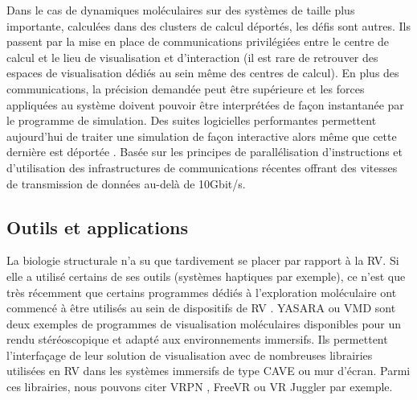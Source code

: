 Dans le cas de dynamiques moléculaires sur des systèmes de taille plus importante, calculées dans des clusters de calcul déportés, les défis sont autres. Ils passent par la mise en place de communications privilégiées entre le centre de calcul et le lieu de visualisation et d'interaction (il est rare de retrouver des espaces de visualisation dédiés au sein même des centres de calcul). En plus des communications, la précision demandée peut être supérieure et les forces appliquées au système doivent pouvoir être interprétées de façon instantanée par le programme de simulation. Des suites logicielles performantes permettent aujourd'hui de traiter une simulation de façon interactive alors même que cette dernière est déportée \cite{dreher2014exaviz}. Basée sur les principes de parallélisation d'instructions et d'utilisation des infrastructures de communications récentes offrant des vitesses de transmission de données au-delà de 10Gbit/s.


\subsection{Outils et applications}

La biologie structurale n'a su que tardivement se placer par rapport à la RV. Si elle a utilisé certains de ses outils (systèmes haptiques par exemple), ce n'est que très récemment que certains programmes dédiés à l'exploration moléculaire ont commencé à être utilisés au sein de dispositifs de RV \cite{odonoghue_visualization_2010}. YASARA \cite{krieger2014yasara} ou VMD \cite{stone_immersive_2010} sont deux exemples de programmes de visualisation moléculaires disponibles pour un rendu stéréoscopique et adapté aux environnements immersifs. Ils permettent l'interfaçage de leur solution de visualisation avec de nombreuses librairies utilisées en RV dans les systèmes immersifs de type CAVE ou mur d'écran. Parmi ces librairies, nous pouvons citer VRPN \cite{taylor2001vrpn}, FreeVR \cite{pape2004commodity} ou VR Juggler par exemple.

